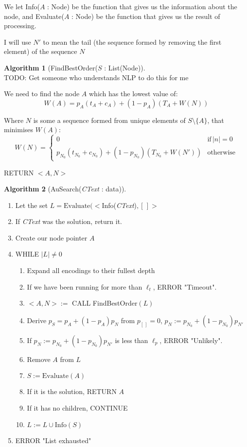 \documentclass{article}
\theoremstyle{definition}
\newtheorem{algorithm}{Algorithm}
\begin{document}
We let Info($A$ : Node) be the function that gives us the information about the 
node, and Evaluate($A$ : Node) be the function that gives us the result of 
processing.

I will use $N'$ to mean the tail (the sequence formed by removing the first element) of
the sequence $N$

\begin{algorithm}[FindBestOrder($S$ : List(Node)]\,\\
TODO: Get someone who understands NLP to do this for me

We need to find the node $A$ which has the lowest value of:
\[
	W(A) =  p_A (t_A + c_A) + (1 - p_A) (T_A + W(N))
\]

	Where $N$ is some a sequence formed from unique elements of $S \setminus \{A\}$, that minimises $W(A)$:
\[ 
	W(N) = 
	\begin{cases}
		0 & \text{if}\,|n| = 0 \\
		p_{N_0} (t_{N_0}+ c_{N_0}) + (1 - p_{N_0}) (T_{N_0} + W(N')) & \text{otherwise}
	\end{cases}
\]

RETURN $<A, N>$
\end{algorithm}

\begin{algorithm}[AuSearch(\textit{CText} : data)]\,\\
\begin{enumerate}
\item Let the set $L = \text{Evaluate}(<$Info(\textit{CText})$, [\,]>$
\item If \textit{CText} was the solution, return it.
\item Create our node pointer $A$
\item WHILE $|L| \neq 0$
	\begin{enumerate}
	\item Expand all encodings to their fullest depth
	\item If we have been running for more than $\ell_t$, ERROR "Timeout".
	\item $<A, N> := $ CALL FindBestOrder$(L)$
	\item Derive $p_S = p_A + (1-p_A) p_N$ from $p_{[\,]} = 0$, $p_N := p_{N_0} + (1-p_{N_0})p_{N'}$
	\item If $p_N := p_{N_0} + (1-p_{N_0})p_{N'}$ is less than $\ell_p$, ERROR "Unlikely".
	\item Remove $A$ from $L$
	\item $S := \text{Evaluate}(A)$
	\item If it is the solution, RETURN $A$
	\item If it has no children, CONTINUE
	\item $L := L \cup \text{Info}(S)$
	\end{enumerate}
\item ERROR "List exhausted"
\end{enumerate}
\end{algorithm}
\end{document}
